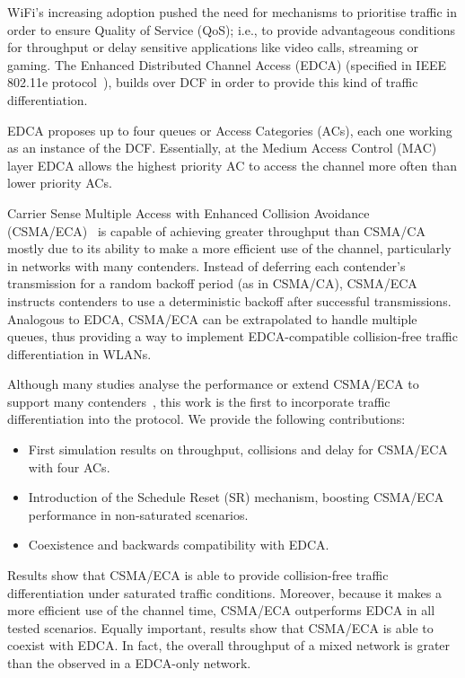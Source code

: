 \documentclass[a4paper,journal]{IEEEtran}
\begin{document}
WiFi's increasing adoption pushed the need for mechanisms to prioritise traffic in order to ensure Quality of Service (QoS); i.e., to provide advantageous conditions for throughput or delay sensitive applications like video calls, streaming or gaming. The Enhanced Distributed Channel Access (EDCA) (specified in IEEE 802.11e protocol~\cite{80211e}), builds over DCF in order to provide this kind of traffic differentiation.

EDCA proposes up to four queues or Access Categories (ACs), each one working as an instance of the DCF. Essentially, at the Medium Access Control (MAC) layer EDCA allows the highest priority AC to access the channel more often than lower priority ACs.

Carrier Sense Multiple Access with Enhanced Collision Avoidance (CSMA/ECA)~\cite{sanabria2014high,research2standards} is capable of achieving greater throughput than CSMA/CA mostly due to its ability to make a more efficient use of the channel, particularly in networks with many contenders. Instead of deferring each contender's transmission for a random backoff period (as in CSMA/CA), CSMA/ECA instructs contenders to use a deterministic backoff after successful transmissions. Analogous to EDCA, CSMA/ECA can be extrapolated to handle multiple queues, thus providing a way to implement EDCA-compatible collision-free traffic differentiation in WLANs. 

Although many studies analyse the performance or extend CSMA/ECA to support many contenders~\cite{bellalta2009vtc,barcelo2011tcf,ECA-DEMO-INFOCOM14,research2standards,sanabria2014high}, this work is the first to incorporate traffic differentiation into the protocol. We provide the following contributions:
\begin{itemize}
	\item First simulation results on throughput, collisions and delay for CSMA/ECA with four ACs.
	\item Introduction of the Schedule Reset (SR) mechanism, boosting CSMA/ECA performance in non-saturated scenarios.
	\item Coexistence and backwards compatibility with EDCA.
\end{itemize}

Results show that CSMA/ECA is able to provide collision-free traffic differentiation under saturated traffic conditions. Moreover, because it makes a more efficient use of the channel time, CSMA/ECA outperforms EDCA in all tested scenarios. Equally important, results show that CSMA/ECA is able to coexist with EDCA. In fact, the overall throughput of a mixed network is grater than the observed in a EDCA-only network.
\end{document}
